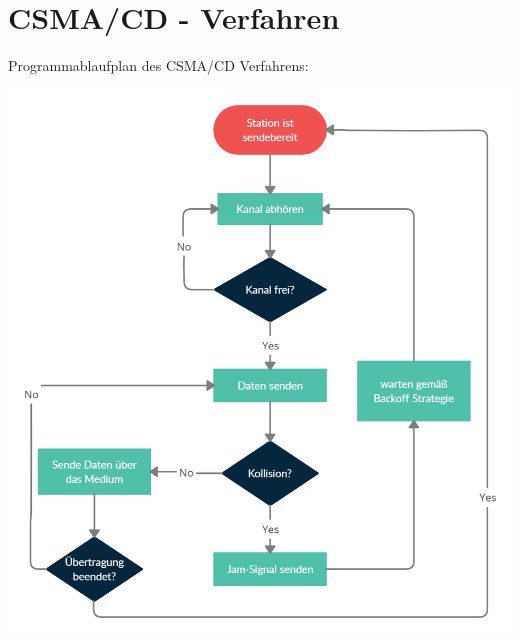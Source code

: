 \documentclass[12pt,a4paper]{article}
\begin{document}
\section{CSMA/CD - Verfahren}
    Programmablaufplan des CSMA/CD Verfahrens:
    \begin{center}
        \includegraphics[scale=0.3]{Bilder/CSMACD.png}
    \end{center}
\end{document}
